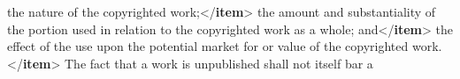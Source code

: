 \begin{shaded}
\hspace*{1em}\hspace*{1em}the nature of the copyrighted work;{</\textbf{item}>}\mbox{}\newline 
\hspace*{1em}\hspace*{1em}the amount and substantiality of the portion\mbox{}\newline 
\hspace*{1em}\hspace*{1em}\hspace*{1em}\hspace*{1em}\hspace*{1em}\hspace*{1em} used in relation to the copyrighted work as a whole;\mbox{}\newline 
\hspace*{1em}\hspace*{1em}\hspace*{1em}\hspace*{1em}\hspace*{1em}\hspace*{1em} and{</\textbf{item}>}\mbox{}\newline 
\hspace*{1em}\hspace*{1em}the effect of the use upon the potential market\mbox{}\newline 
\hspace*{1em}\hspace*{1em}\hspace*{1em}\hspace*{1em}\hspace*{1em}\hspace*{1em} for or value of the copyrighted work.{</\textbf{item}>}\mbox{}\newline 
\hspace*{1em}\mbox{}\newline 
\hspace*{1em}\hspace*{1em} The fact that a work is unpublished shall not itself bar a\mbox{}\newline 

\end{shaded}
